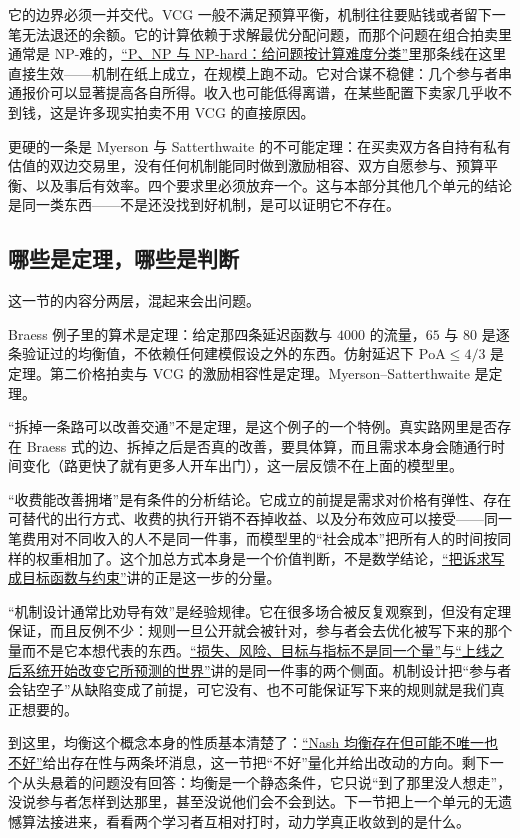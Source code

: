 它的边界必须一并交代。VCG 一般不满足预算平衡，机制往往要贴钱或者留下一笔无法退还的余额。它的计算依赖于求解最优分配问题，而那个问题在组合拍卖里通常是 NP-难的，\hyperref[sec:09-Convex-Optimization/09-Complexity-and-Approximation/01]{``P、NP 与 NP-hard：给问题按计算难度分类''}里那条线在这里直接生效——机制在纸上成立，在规模上跑不动。它对合谋不稳健：几个参与者串通报价可以显著提高各自所得。收入也可能低得离谱，在某些配置下卖家几乎收不到钱，这是许多现实拍卖不用 VCG 的直接原因。

更硬的一条是 Myerson 与 Satterthwaite 的不可能定理：在买卖双方各自持有私有估值的双边交易里，没有任何机制能同时做到激励相容、双方自愿参与、预算平衡、以及事后有效率。四个要求里必须放弃一个。这与本部分其他几个单元的结论是同一类东西——不是还没找到好机制，是可以证明它不存在。

\subsection{哪些是定理，哪些是判断}

这一节的内容分两层，混起来会出问题。

Braess 例子里的算术是定理：给定那四条延迟函数与 \(4000\) 的流量，\(65\) 与 \(80\) 是逐条验证过的均衡值，不依赖任何建模假设之外的东西。仿射延迟下 \(\mathrm{PoA}\le4/3\) 是定理。第二价格拍卖与 VCG 的激励相容性是定理。Myerson--Satterthwaite 是定理。

``拆掉一条路可以改善交通''不是定理，是这个例子的一个特例。真实路网里是否存在 Braess 式的边、拆掉之后是否真的改善，要具体算，而且需求本身会随通行时间变化（路更快了就有更多人开车出门），这一层反馈不在上面的模型里。

``收费能改善拥堵''是有条件的分析结论。它成立的前提是需求对价格有弹性、存在可替代的出行方式、收费的执行开销不吞掉收益、以及分布效应可以接受——同一笔费用对不同收入的人不是同一件事，而模型里的``社会成本''把所有人的时间按同样的权重相加了。这个加总方式本身是一个价值判断，不是数学结论，\hyperref[sec:18-Synthesis/01-System-Lifecycle/01]{``把诉求写成目标函数与约束''}讲的正是这一步的分量。

``机制设计通常比劝导有效''是经验规律。它在很多场合被反复观察到，但没有定理保证，而且反例不少：规则一旦公开就会被针对，参与者会去优化被写下来的那个量而不是它本想代表的东西。\hyperref[sec:13-Machine-Learning/01-Learning-Problems-and-Evaluation/02]{``损失、风险、目标与指标不是同一个量''}与\hyperref[sec:18-Synthesis/01-System-Lifecycle/06]{``上线之后系统开始改变它所预测的世界''}讲的是同一件事的两个侧面。机制设计把``参与者会钻空子''从缺陷变成了前提，可它没有、也不可能保证写下来的规则就是我们真正想要的。

到这里，均衡这个概念本身的性质基本清楚了：\hyperref[sec:17-Constrained-Guarantees/06-Games-and-Equilibria/02]{``Nash 均衡存在但可能不唯一也不好''}给出存在性与两条坏消息，这一节把``不好''量化并给出改动的方向。剩下一个从头悬着的问题没有回答：均衡是一个静态条件，它只说``到了那里没人想走''，没说参与者怎样到达那里，甚至没说他们会不会到达。下一节把上一个单元的无遗憾算法接进来，看看两个学习者互相对打时，动力学真正收敛到的是什么。
